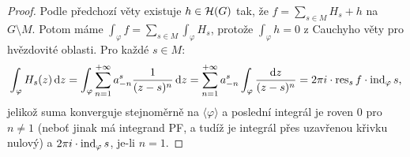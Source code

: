 \begin{proof}
Podle předchozí věty existuje $h \in \operatorname{\mathcal{H}} (G)$ tak, že $f=\sum\limits_{s\in M}H_s+h$ na $G \setminus M$. Potom máme $\int_\varphi f=\sum\limits_{s\in M}\int_\varphi H_s$, protože $\int_\varphi h =0$ z Cauchyho věty pro hvězdovité oblasti. Pro každé $s \in M$:
$$
\int_\varphi H_s(z) \mathop{}\!\mathrm{d} z=\int_\varphi \sum\limits_{n=1}^{+\infty}a_{-n}^s\frac{1}{(z-s)^n} \mathop{}\!\mathrm{d} z = \sum\limits_{n=1}^{+\infty}a_{-n}^s \int_\varphi \frac{\mathop{}\!\mathrm{d} z}{(z-s)^n}=2\pi i \cdot \operatorname{res}_sf\cdot \operatorname{ind}_\varphi s\text{,}
$$
jelikož suma konverguje stejnoměrně na $\langle\varphi \rangle$ a poslední integrál je roven $0$ pro $n \neq 1$ (neboť jinak má integrand PF, a tudíž je integrál přes uzavřenou křivku nulový) a $2 \pi i \cdot \operatorname{ind}_\varphi s$, je-li $n=1$.
\end{proof}
